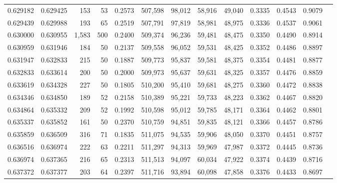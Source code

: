 \begin{tabular}{rrrrrrrrrrrrr}
0.629182 & 0.629425 &   153 &  53 &                                     0.2573 & 507,598 &  98,012 &  58,916 &  49,040 & 0.3335 & 0.4543 & 0.9079 \\
0.629439 & 0.629988 &   193 &  65 &                                     0.2519 & 507,791 &  97,819 &  58,981 &  48,975 & 0.3336 & 0.4537 & 0.9061 \\
0.630000 & 0.630955 & 1,583 & 500 &                                     0.2400 & 509,374 &  96,236 &  59,481 &  48,475 & 0.3350 & 0.4490 & 0.8914 \\
0.630959 & 0.631946 &   184 &  50 &                                     0.2137 & 509,558 &  96,052 &  59,531 &  48,425 & 0.3352 & 0.4486 & 0.8897 \\
0.631947 & 0.632833 &   215 &  50 &                                     0.1887 & 509,773 &  95,837 &  59,581 &  48,375 & 0.3354 & 0.4481 & 0.8877 \\
0.632833 & 0.633614 &   200 &  50 &                                     0.2000 & 509,973 &  95,637 &  59,631 &  48,325 & 0.3357 & 0.4476 & 0.8859 \\
0.633619 & 0.634328 &   227 &  50 &                                     0.1805 & 510,200 &  95,410 &  59,681 &  48,275 & 0.3360 & 0.4472 & 0.8838 \\
0.634346 & 0.634850 &   189 &  52 &                                     0.2158 & 510,389 &  95,221 &  59,733 &  48,223 & 0.3362 & 0.4467 & 0.8820 \\
0.634864 & 0.635332 &   209 &  52 &                                     0.1992 & 510,598 &  95,012 &  59,785 &  48,171 & 0.3364 & 0.4462 & 0.8801 \\
0.635337 & 0.635852 &   161 &  50 &                                     0.2370 & 510,759 &  94,851 &  59,835 &  48,121 & 0.3366 & 0.4457 & 0.8786 \\
0.635859 & 0.636509 &   316 &  71 &                                     0.1835 & 511,075 &  94,535 &  59,906 &  48,050 & 0.3370 & 0.4451 & 0.8757 \\
0.636516 & 0.636974 &   222 &  63 &                                     0.2211 & 511,297 &  94,313 &  59,969 &  47,987 & 0.3372 & 0.4445 & 0.8736 \\
0.636974 & 0.637365 &   216 &  65 &                                     0.2313 & 511,513 &  94,097 &  60,034 &  47,922 & 0.3374 & 0.4439 & 0.8716 \\
0.637372 & 0.637377 &   203 &  64 &                                     0.2397 & 511,716 &  93,894 &  60,098 &  47,858 & 0.3376 & 0.4433 & 0.8697 \\

\end{tabular}
